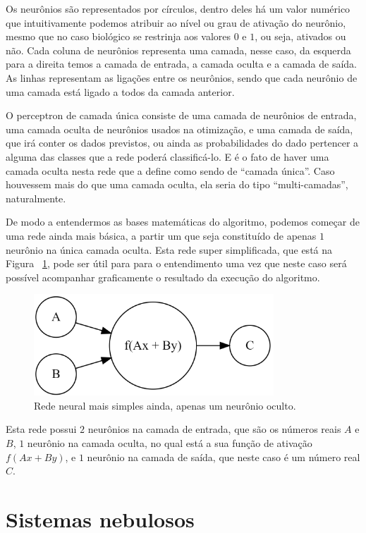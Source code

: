 Os neurônios são representados por círculos, dentro deles há um valor numérico que intuitivamente podemos atribuir ao nível ou grau de ativação do neurônio, mesmo que no caso biológico se restrinja aos valores $0$ e $1$, ou seja, ativados ou não. Cada coluna de neurônios representa uma camada, nesse caso, da esquerda para a direita temos a camada de entrada, a camada oculta e a camada de saída. As linhas representam as ligações entre os neurônios, sendo que cada neurônio de uma camada está ligado a todos da camada anterior.

O perceptron de camada única consiste de uma camada de neurônios de entrada, uma camada oculta de neurônios usados na otimização, e uma camada de saída, que irá conter os dados previstos, ou ainda as probabilidades do dado pertencer a alguma das classes que a rede poderá classificá-lo. E é o fato de haver uma camada oculta nesta rede que a define como sendo de ``camada única''. Caso houvessem mais do que uma camada oculta, ela seria do tipo ``multi-camadas'', naturalmente.

De modo a entendermos as bases matemáticas do algoritmo, podemos começar de uma rede ainda mais básica, a partir um  que seja constituído de apenas $1$ neurônio na única camada oculta. Esta rede super simplificada, que está na Figura ~\ref{fig:neuronio}, pode ser útil para para o entendimento uma vez que neste caso será possível acompanhar graficamente o resultado da execução do algoritmo.

\begin{figure}[htb]
\centering
\includegraphics[width=9cm]{figuras/neuronio}
\caption{\label{fig:neuronio}Rede neural mais simples ainda, apenas um neurônio oculto.}
\end{figure}

Esta rede possui $2$ neurônios na camada de entrada, que são os números reais $A$ e $B$, $1$ neurônio na camada oculta, no qual está a sua função de ativação $f(Ax + By)$, e $1$ neurônio na camada de saída, que neste caso é um número real $C$.

\section{Sistemas nebulosos}

